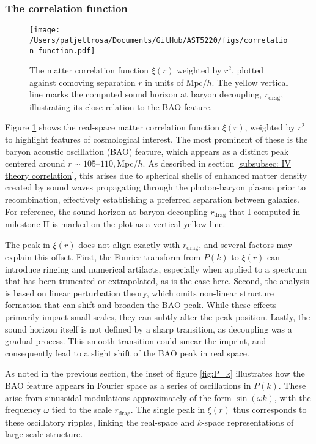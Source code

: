 \documentclass{aa}
\numberwithin{equation}{section}
\numberwithin{table}{section}
\numberwithin{figure}{section}
\begin{document}
\subsubsection{The correlation function}
\begin{figure}
\centering
\texttt{[image: /Users/paljettrosa/Documents/GitHub/AST5220/figs/correlation\_function.pdf]}
\caption{The matter correlation function $\xi(r)$ weighted by $r^2$, plotted against comoving separation $r$ in units of $\text{Mpc}/h$. The yellow vertical line marks the computed sound horizon at baryon decoupling, $r_\text{drag}$, illustrating its close relation to the BAO feature.}\label{fig:correlation function}
\end{figure}

Figure \ref{fig:correlation function} shows the real-space matter correlation function $\xi(r)$, weighted by $r^2$ to highlight features of cosmological interest. The most prominent of these is the baryon acoustic oscillation (BAO) feature, which appears as a distinct peak centered around $r \sim 105$--$110,$Mpc/$h$. As described in section \ref{subsubsec: IV theory correlation}, this arises due to spherical shells of enhanced matter density created by sound waves propagating through the photon-baryon plasma prior to recombination, effectively establishing a preferred separation between galaxies. For reference, the sound horizon at baryon decoupling $r_\text{drag}$ that I computed in milestone II is marked on the plot as a vertical yellow line. 

The peak in $\xi(r)$ does not align exactly with $r_\text{drag}$, and several factors may explain this offset. First, the Fourier transform from $P(k)$ to $\xi(r)$ can introduce ringing and numerical artifacts, especially when applied to a spectrum that has been truncated or extrapolated, as is the case here. Second, the analysis is based on linear perturbation theory, which omits non-linear structure formation that can shift and broaden the BAO peak. While these effects primarily impact small scales, they can subtly alter the peak position. Lastly, the sound horizon itself is not defined by a sharp transition, as decoupling was a gradual process. This smooth transition could smear the imprint, and consequently lead to a slight shift of the BAO peak in real space.

As noted in the previous section, the inset of figure \ref{fig:P_k} illustrates how the BAO feature appears in Fourier space as a series of oscillations in $P(k)$. These arise from sinusoidal modulations approximately of the form $\sin(\omega k)$, with the frequency $\omega$ tied to the scale $r_\text{drag}$. The single peak in $\xi(r)$ thus corresponds to these oscillatory ripples, linking the real-space and $k$-space representations of large-scale structure.
\end{document}
